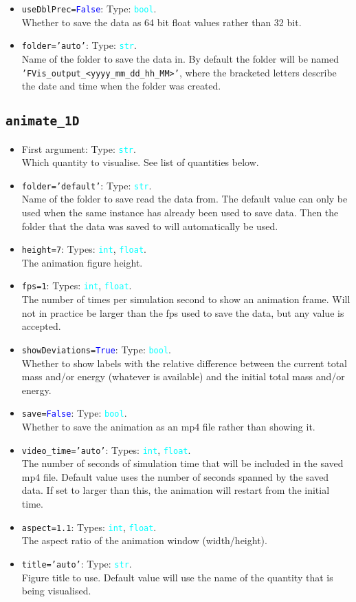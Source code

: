 \documentclass{article}
\newcommand{\ttt}[1]{\texttt{#1}}
\newcommand{\ptype}[1]{\texttt{\textcolor{cyan}{#1}}}
\newcommand{\cbl}[1]{\textcolor{blue}{#1}}
\newcommand{\cro}[1]{\textcolor{RedOrange}{#1}}
\newcommand{\cyo}[1]{\textcolor{YellowOrange}{#1}}
\begin{document}
\begin{itemize}
	\item \ttt{\cro{useDblPrec}=\cbl{False}}: Type: \ptype{bool}.\\Whether to save the data as 64 bit float values rather than 32 bit.
	\item \ttt{\cro{folder}=\cyo{'auto'}}: Type: \ptype{str}.\\Name of the folder to save the data in. By default the folder will be named \ttt{'FVis\_output\_<yyyy\_mm\_dd\_hh\_MM>'}, where the bracketed letters describe the date and time when the folder was created.
\end{itemize}

\subsection{\ttt{animate\_1D}}
\label{sec:anim1}
\begin{itemize}
	\item First argument: Type: \ptype{str}.\\Which quantity to visualise. See list of quantities below.
	\item \ttt{\cro{folder}=\cyo{'default'}}: Type: \ptype{str}.\\Name of the folder to save read the data from. The default value can only be used when the same instance has already been used to save data. Then the folder that the data was saved to will automatically be used.
	\item \ttt{\cro{height}=7}: Types: \ptype{int}, \ptype{float}.\\The animation figure height.
	\item \ttt{\cro{fps}=1}: Types: \ptype{int}, \ptype{float}.\\The number of times per simulation second to show an animation frame. Will not in practice be larger than the fps used to save the data, but any value is accepted.
	\item \ttt{\cro{showDeviations}=\cbl{True}}: Type: \ptype{bool}.\\Whether to show labels with the relative difference between the current total mass and/or energy (whatever is available) and the initial total mass and/or energy.
	\item \ttt{\cro{save}=\cbl{False}}: Type: \ptype{bool}.\\Whether to save the animation as an mp4 file rather than showing it.
	\item \ttt{\cro{video\_time}=\cyo{'auto'}}: Types: \ptype{int}, \ptype{float}.\\The number of seconds of simulation time that will be included in the saved mp4 file. Default value uses the number of seconds spanned by the saved data. If set to larger than this, the animation will restart from the initial time.
	\item \ttt{\cro{aspect}=1.1}: Types: \ptype{int}, \ptype{float}.\\The aspect ratio of the animation window (width/height).
	\item \ttt{\cro{title}=\cyo{'auto'}}: Type: \ptype{str}.\\Figure title to use. Default value will use the name of the quantity that is being visualised.
\end{itemize}
\end{document}

